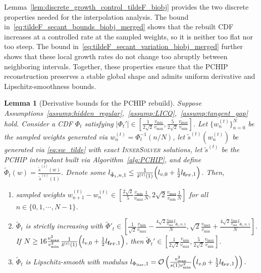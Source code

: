 \documentclass{article}
\newtheorem{lemma}{Lemma}
\newcommand{\Oc}{\mathcal{O}}
\newcommand{\fPF}{{\mathbf{f}_{\rm PF}}}
\newcommand{\Farc}{\Phi}
\begin{document}
Lemma~\ref{lem:discrete_growth_control_tildeF_biobj} provides the two discrete properties needed for the interpolation analysis. The bound in~\eqref{eq:tildeF_secant_bounds_biobj_merged} shows that the rebuilt CDF increases at a controlled rate at the sampled weights, so it is neither too flat nor too steep. The bound in~\eqref{eq:tildeF_secant_variation_biobj_merged} further shows that these local growth rates do not change too abruptly between neighboring intervals. Together, these properties ensure that the PCHIP reconstruction preserves a stable global shape and admits uniform derivative and Lipschitz-smoothness bounds.

\begin{lemma}[Derivative bounds for the PCHIP rebuild]
\label{lem:pchip_derivative_bounds}
Suppose Assumptions~\ref{assump:hidden_regular},~\ref{assump:LICQ},~\ref{assump:tangent_gap} hold. Consider a CDF $\Farc_t$ satisfying $|\Farc_t'|\in \left[ \frac{1}{2\sqrt2}\frac{v_{\min}}{v_{\max}}, \frac{5}{2\sqrt2}\frac{v_{\max}}{v_{\min}}\right]$. Let
$\{w_n^{(t)}\}_{n=0}^N$ be the sampled weights generated via $w_n^{(t)} = \Farc_t^{-1}(n/N)$, let $\tilde s^{(t)}(w_n^{(t)})$ be generated via \eqref{eq:sw_tilde} with exact \textsc{InnerSolver} solutions, let $\tilde s^{(t)}$ be the PCHIP interpolant built via Algorithm~\ref{alg:PCHIP}, and define $\tilde \Farc_t(w) =\frac{\tilde s^{(t)}(w)}{\tilde s^{(t)}(1)}$. 
Denote some $l_{\tilde \Farc_t,n,1} \leq \frac{1}{\tilde s^{(t)}(1)}\Bigl(l_{v,0}+\frac12 l_{\fPF,1}\Bigr)$.
Then, 
\begin{enumerate}[label=(\roman*), leftmargin=*, align=left]
 \item 
 \label{claim:grid}
 sampled weights $w_{n+1}^{(t)}-w_n^{(t)}\in\left[ \frac{2\sqrt2}{5}\frac{v_{\min}}{v_{\max}}\frac{1}{N}, 2\sqrt2\frac{v_{\max}}{v_{\min}}\frac{1}{N}
 \right]$ for all $n \in \{0,1,\cdots,N-1\}$.
 \item 
 \label{claim:secant}
 $\tilde \Farc_t$ is strictly increasing with
 $
 \tilde \Farc'_t \in \left[\frac{1}{\sqrt2}\frac{v_{\min}}{v_{\max}}-\frac{4\sqrt2\frac{v_{\max}}{v_{\min}}l_{\tilde \Farc_t,n,1}}{N}, 
 \sqrt2\frac{v_{\max}}{v_{\min}}+\frac{4\sqrt2\frac{v_{\max}}{v_{\min}}l_{\tilde \Farc_t,n,1}}{N}\right].
 $
 If
 $
 N \ge 16 \frac{v_{\max}^2}{v_{\min}^2} \frac{1}{\tilde s^{(t)}(1)}
 \Bigl(l_{v,0}+\frac12 l_{\fPF,1}\Bigr)
 $, then
 $
 \tilde \Farc_t'\in \left[ \frac{1}{2\sqrt2}\frac{v_{\min}}{v_{\max}}, \frac{5}{2\sqrt2}\frac{v_{\max}}{v_{\min}}\right].
 $
 \item \label{claim:smooth}
 $\tilde \Farc_t$ is Lipschitz-smooth with modulus
 $
 l_{\Farc_{\rm iter},1} = \Oc\left(\frac{v_{\max}^2}{s(1) v_{\min}^2} \Bigl(l_{v,0}+\frac12 l_{\fPF,1}\Bigr)\right).
 $
\end{enumerate}
\end{lemma}
\end{document}
